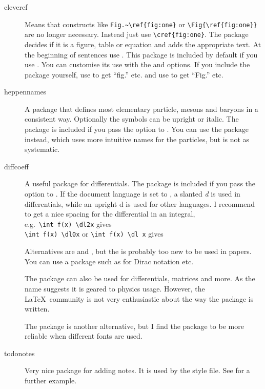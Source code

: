 \begin{description}
  \item[cleveref] Means that constructs like \verb|Fig.~\ref{fig:one}| or
  \verb|\Fig{\ref{fig:one}}| are no longer necessary.
  Instead just use \verb|\cref{fig:one}|.
  The package decides if it is a figure, table or equation and
  adds the appropriate text.
  At the beginning of sentences use .
  This package is included by default if you use .
  You can customise its use with the  and  options.
  If you include the package yourself, use  to get \enquote{fig.} etc. and
  use  to get \enquote{Fig.} etc.

  \item[heppennames] A package that defines most elementary particle, mesons and baryons in a
  consistent way. Optionally the symbols can be upright or italic.
  The package is included if you pass the option  to .
  You can use the package  instead, which uses more intuitive names for the particles,
  but is not as systematic.

  \item[diffcoeff] A useful package for differentials.
   The package is included if you pass the option  to .
  If the document language is set to ,
  a slanted \textit{d} is used in differentials,
  while an upright \textrm{d} is used for other languages.
  I recommend  to get a nice spacing for the differential in an integral,\\
  e.g.\ \verb|\int f(x) \dl2x| gives 
  \\
  \verb|\int f(x) \dl0x| or \verb|\int f(x) \dl x| gives  
    
  Alternatives are  and ,
  but the  is probably too new to be used in papers.
  You can use a package such as  for Dirac notation etc.

  The package  can also be used for differentials, matrices and more.
  As the name suggests it is geared to physics usage.
  However, the \LaTeX\ community is not very enthusiastic about the way the package is written.
  
  The  package is another alternative,
  but I find the  package to be more reliable when different fonts are used.

  \item[todonotes] Very nice package for adding notes.
  It is used by the  style file.
  See  for a further example.
\end{description}



